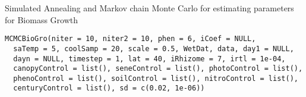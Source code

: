 \documentclass[letterpaper]{book}
\begin{document}
%
\begin{Description}\relax
Simulated Annealing and Markov chain Monte Carlo for
estimating parameters for Biomass Growth
\end{Description}
%
\begin{Usage}
\begin{verbatim}
MCMCBioGro(niter = 10, niter2 = 10, phen = 6, iCoef = NULL,
  saTemp = 5, coolSamp = 20, scale = 0.5, WetDat, data, day1 = NULL,
  dayn = NULL, timestep = 1, lat = 40, iRhizome = 7, irtl = 1e-04,
  canopyControl = list(), seneControl = list(), photoControl = list(),
  phenoControl = list(), soilControl = list(), nitroControl = list(),
  centuryControl = list(), sd = c(0.02, 1e-06))
\end{verbatim}
\end{Usage}
%
\end{document}
